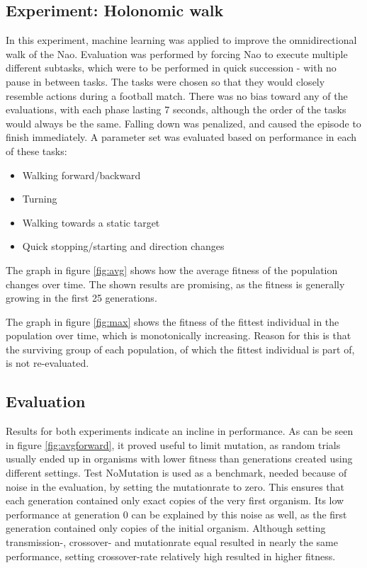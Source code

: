 \documentclass{article}
\begin{document}
\subsection{Experiment: Holonomic walk}
In this experiment, machine learning was applied to improve the omnidirectional walk of the Nao. Evaluation was performed by forcing Nao to execute multiple different subtasks, which were to be performed in quick succession - with no pause in between tasks. The tasks were chosen so that they would closely resemble actions during a football match. There was no bias toward any of the evaluations, with each phase lasting 7 seconds, although the order of the tasks would always be the same. Falling down was penalized, and caused the episode to finish immediately. A parameter set was evaluated based on performance in each of these tasks:
\begin{itemize}
\item Walking forward/backward
\item Turning
\item Walking towards a static target
\item Quick stopping/starting and direction changes
\end{itemize}

The graph in figure \ref{fig:avg} shows how the average fitness of the population changes over time. The shown results are promising, as the fitness is generally growing in the first 25 generations. 

The graph in figure \ref{fig:max} shows the fitness of the fittest individual in the population over time, which is monotonically increasing. Reason for this is that the surviving group of each population, of which the fittest individual is part of, is not re-evaluated. 

\subsection{Evaluation}
Results for both experiments indicate an incline in performance. As can be seen in figure \ref{fig:avgforward}, it proved useful to limit mutation, as random trials usually ended up in organisms with lower fitness than generations created using different settings. Test NoMutation is used as a benchmark, needed because of noise in the evaluation, by setting the mutationrate to zero. This ensures that each generation contained only exact copies of the very first organism. Its low performance at generation 0 can be explained by this noise as well, as the first generation contained only copies of the initial organism. Although setting transmission-, crossover- and mutationrate equal resulted in nearly the same performance, setting crossover-rate relatively high resulted in higher fitness. 
\end{document}
